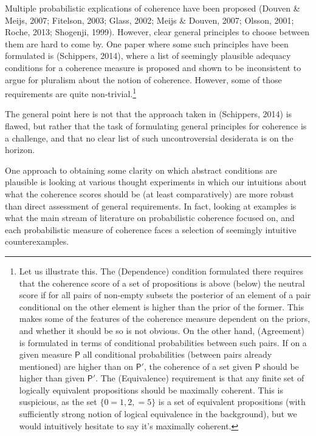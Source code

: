\documentclass[
  10pt,
]{scrartcl}
\begin{document}
Multiple probabilistic explications of coherence have been proposed
(Douven \& Meijs, 2007; Fitelson, 2003; Glass, 2002; Meijs \& Douven, 2007; Olsson, 2001; Roche, 2013; Shogenji, 1999). However, clear general principles to choose between them are hard to come by. One paper where some such principles have been formulated is (Schippers, 2014), where a list of seemingly plausible adequacy conditions for a coherence measure is proposed and shown to be inconsistent to argue for pluralism about the notion of coherence. However, some of those requirements are quite non-trivial.\footnote{Let us illustrate this. The (Dependence) condition formulated there requires that the coherence score of a set of propositions is above (below) the neutral score if for all pairs of non-empty subsets the posterior of an element of a pair conditional on the other element is higher than the prior of the former. This makes some of the features of the coherence measure dependent on the priors, and whether it should be so is not obvious. On the other hand, (Agreement) is formulated in terms of conditional probabilities between such pairs. If on a given measure \(\mathsf{P}\) all conditional probabilities (between pairs already mentioned) are higher than on \(\mathsf{P}'\), the coherence of a set given \(\mathsf{P}\) should be higher than given \(\mathsf{P}'\). The (Equivalence) requirement is that any finite set of logically equivalent propositions should be maximally coherent. This is suspicious, as the set \(\{ 0= 1, 2, = 5\}\) is a set of equivalent propositions (with sufficiently strong notion of logical equivalence in the background), but we would intuitively hesitate to say it's maximally coherent.}

The general point here is not that the approach taken in (Schippers, 2014) is flawed, but rather that the task of formulating general principles for coherence is a challenge, and that no clear list of such uncontroversial desiderata is on the horizon.

One approach to obtaining some clarity on which abstract conditions are plausible is looking at various thought experiments in which our intuitions about what the coherence scores should be (at least comparatively) are more robust than direct assessment of general requirements. In fact, looking at examples is what the main stream of literature on probabilistic coherence focused on, and each probabilistic measure of coherence faces a selection of seemingly intuitive counterexamples.
\end{document}
